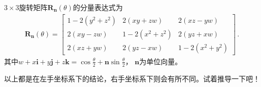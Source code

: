 \begin{corollary}
    $3\times3$旋转矩阵$\bm R_{\bm n}(\theta)$的分量表达式为
    \begin{align}
        \bm R_{\bm n}(\theta)=\left[\begin{array}{ccc}
                1-2(y^2+z^2) & 2(xy+zw)     & 2(xz-yw)     \\
                2(xy-zw)     & 1-2(x^2+z^2) & 2(yz+xw)     \\
                2(xz+yw)     & 2(yz-xw)     & 1-2(x^2+y^2)
            \end{array}\right]\, .
    \end{align}
    其中$\displaystyle w+x\mathbf{i}+y\mathbf{j}+z\mathbf{k}=\cos\frac{\theta}{2}+\bm n\sin\frac{\theta}{2}$，
    $\bm n$为单位向量。
\end{corollary}

\begin{remark}
    以上都是在左手坐标系下的结论，右手坐标系下则会有所不同。试着推导一下吧！
\end{remark}

